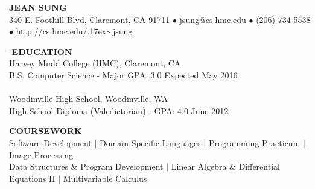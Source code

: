 \documentclass[11pt]{article}
\makeatletter
\newcommand{\selfName}{\LARGE\textbf{JEAN SUNG}}
\newcommand{\addrA}{\small 340 E. Foothill Blvd, }
\newcommand{\addrB}{\small Claremont, CA 91711}
\newcommand{\email}{\small{jsung@cs.hmc.edu}}
\newcommand{\phone}{(206)-734-5538 }
\newcommand{\tildeText}{\raise.17ex\hbox{$\scriptstyle\sim$}}
\newcommand{\website}{\small{http://cs.hmc.edu/\tildeText jsung}}
\newcommand{\headerdot}{  $\bullet$  }
\newcommand{\vb}{ $\mid$ }
\newcommand{\sectionNL}{\\[-2pt]}
\makeatother
\begin{document}
\begin{center}
\selfName \\
 \addrA \addrB \headerdot \email \headerdot \phone \headerdot \website
\end{center}

\vspace{-10pt}


\begin{tabbing}
\hspace*{6.45in}\= \kill
{\textbf{EDUCATION} } \> \sectionNL
Harvey Mudd College (HMC), Claremont, CA \> \\
B.S. Computer Science - Major GPA: 3.0 \>Expected May 2016  \\ \\


Woodinville High School, Woodinville, WA \> \\
High School Diploma (Valedictorian) - GPA: 4.0 \>June 2012
\end{tabbing}


\begin{flushleft}
{\textbf{COURSEWORK}} \sectionNL
Software Development \vb Domain Specific Languages \vb Programming Practicum \vb Image Processing \\
Data Structures \& Program Development \vb Linear Algebra \& Differential Equations II \vb Multivariable Calculus  \\

\end{flushleft}

\end{document}
